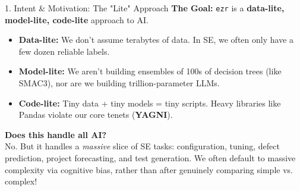 \begin{frame}{1. Intent \& Motivation: The "Lite" Approach}
  \vspace{0.3cm}
  \textbf{The Goal:} \texttt{ezr} is a \textbf{data-lite, model-lite, code-lite} approach to AI.
  
  \vspace{0.2cm}
  \begin{itemize}
      \item \textbf{Data-lite:} We don't assume terabytes of data. In SE, we often only have a few dozen reliable labels.
      \item \textbf{Model-lite:} We aren't building ensembles of 100s of decision trees (like SMAC3), nor are we building trillion-parameter LLMs.
      \item \textbf{Code-lite:} Tiny data + tiny models = tiny scripts. Heavy libraries like Pandas violate our core tenets (\textbf{YAGNI}).
  \end{itemize}

  \vspace{0.4cm}
  \textbf{Does this handle all AI?} \\
  No. But it handles a \textit{massive} slice of SE tasks: configuration, tuning, defect prediction, project forecasting, and test generation. We often default to massive complexity via cognitive bias, rather than after genuinely comparing simple vs. complex!
\end{frame}

